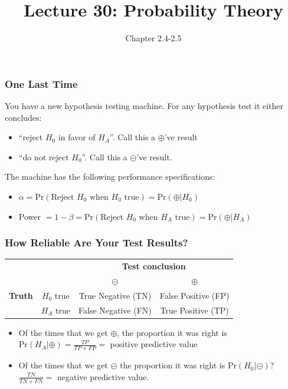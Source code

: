 \documentclass[slides]{beamer}
\title{Lecture 30: Probability Theory}
\author{Chapter 2.4-2.5}
\date{}
\newcommand{\blue}[1]{\textcolor{blue2}{#1}}
\newcommand{\prob}{\mbox{Pr}}
\newcommand{\cp}{\oplus}
\newcommand{\cm}{\circleddash}
\begin{document}
\begin{frame}
\titlepage
\end{frame}



\begin{frame}
\frametitle{One Last Time}
You have a new hypothesis testing machine.  For any hypothesis test it either concludes:
\begin{itemize}
\item ``reject $H_0$ in favor of $H_A$''.  Call this a $\cp$'ve result
\item ``do not reject $H_0$''.  Call this a $\cm$'ve result.
\end{itemize}
\pause
\vspace{0.5cm}

The machine has the following performance specifications:
\begin{itemize}
\item $\alpha=\prob(\mbox{Reject } H_0 \mbox{ when $H_0$ true}) = \prob(\cp|H_0)$
\item Power $=1-\beta=\prob(\mbox{Reject } H_0 \mbox{ when $H_A$ true}) = \prob(\cp|H_A)$
\end{itemize} 

\end{frame}



\begin{frame}
\frametitle{How Reliable Are Your Test Results?}

\begin{center}
  \begin{tabular}{cc|cc}
     \multicolumn{2}{c}{}  & \multicolumn{2}{c}{\textbf{Test conclusion}} \\ 
     &  & $\cm$ & $\cp$ \\ 
\hline
    \textbf{Truth} & $H_0$ true & True Negative (TN) & False Positive (FP) \\
     & $H_A$ true & False Negative (FN) & True Positive (TP)\\ 
    \hline
  \end{tabular}
\end{center}



\begin{itemize}
\pause\item Of the times that we get $\cp$, the proportion it was right is $\prob(H_A|\cp) = \frac{TP}{TP+FP} = $ \blue{positive predictive value}
\pause\item Of the times that we get $\cm$ the proportion it was right is $\prob(H_0|\cm)$? \ $\frac{TN}{TN+FN} = $ \blue{negative predictive value}.  
\end{itemize}

\end{frame}
\end{document}
